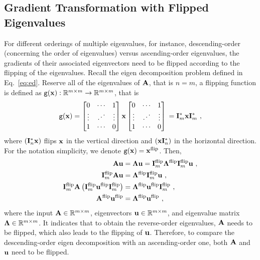 \subsection{Gradient Transformation with Flipped Eigenvalues}
For different orderings of multiple eigenvalues, for instance, descending-order (concerning the order of eigenvalues) versus ascending-order eigenvalues, the gradients of their associated eigenvectors need to be flipped according to the flipping of the eigenvalues.
Recall the eigen decomposition problem defined in Eq.~\eqref{eq:ed}.
Reserve all of the eigenvalues of $\mathbf{A}$, that is $n=m$, a flipping function is defined as $\texttt{g}(\mathbf{x}): \mathbb{R}^{m \times m} \rightarrow \mathbb{R}^{m \times m}$, that is
\begin{equation}
\label{eq:flip}
\texttt{g}(\mb{x}) =
\begin{bmatrix}
 0 & \cdots &  1 \\
 \vdots & \iddots & \vdots \\
1 & \cdots & 0
\end{bmatrix}
%
\mb{x}
%
\begin{bmatrix}
 0 & \cdots &  1 \\
 \vdots & \iddots & \vdots \\
1 & \cdots & 0
\end{bmatrix} \\
=
\mb{I}^{\ast}_{m} \mb{x} \mb{I}^{\ast}_{m}\ ,
\end{equation}
where $(\mathbf{I}^{\ast}_n \mathbf{x})$ flips $\mathbf{x}$ in the vertical direction and $(\mathbf{x} \mathbf{I}^{\ast}_n)$ in the horizontal direction.
For the notation simplicity, we denote $\texttt{g}(\mathbf{x})=\mathbf{x}^{\text{flip}}$.
Then,
\begin{align}
    \mathbf{A} \mathbf{u}
    &= \mathbf{\Lambda} \mathbf{u}
    = \mathbf{I}^{\text{flip}}_m \mathbf{\Lambda}^{\text{flip}} \mathbf{I}^{\text{flip}}_m \mathbf{u}\ , \\
    \mathbf{I}^{\text{flip}}_m \mathbf{A} \mathbf{u}
    &= \mathbf{\Lambda}^{\text{flip}} \mathbf{I}^{\text{flip}}_m \mathbf{u}\ , \\
    \mathbf{I}^{\text{flip}}_m \mathbf{A} \left( \mathbf{I}^{\text{flip}}_m \mathbf{u}^{\text{flip}} \mathbf{I}^{\text{flip}}_m \right)
    &= \mathbf{\Lambda}^{\text{flip}} \mathbf{u}^{\text{flip}} \mathbf{I}^{\text{flip}}_m\ , \\
    \mathbf{A}^{\text{flip}} \mathbf{u}^{\text{flip}}
    &= \mathbf{\Lambda}^{\text{flip}} \mathbf{u}^{\text{flip}}\ ,
\end{align}
where the input $\mathbf{A} \in \mathbb{R}^{m \times m}$, eigenvectors $\mathbf{u} \in \mathbb{R}^{m \times m}$, and eigenvalue matrix $\mathbf{\Lambda} \in \mathbb{R}^{m \times m}$.
It indicates that to obtain the reverse-order eigenvalues, $\mathbf{A}$ needs to be flipped, which also leads to the flipping of
$\mathbf{u}$.
Therefore, to compare the descending-order eigen decomposition with an ascending-order one, both $\mathbf{A}$ and $\mathbf{u}$ need to be flipped.

